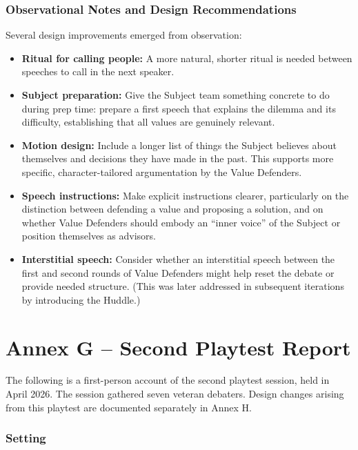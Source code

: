 \documentclass[12pt]{article}
\begin{document}
\subsubsection{Observational Notes and Design Recommendations}

Several design improvements emerged from observation:

\begin{itemize}
    \item \textbf{Ritual for calling people:} A more natural, shorter ritual is needed between speeches to call in the next speaker.
    \item \textbf{Subject preparation:} Give the Subject team something concrete to do during prep time: prepare a first speech that explains the dilemma and its difficulty, establishing that all values are genuinely relevant.
    \item \textbf{Motion design:} Include a longer list of things the Subject believes about themselves and decisions they have made in the past. This supports more specific, character-tailored argumentation by the Value Defenders.
    \item \textbf{Speech instructions:} Make explicit instructions clearer, particularly on the distinction between defending a value and proposing a solution, and on whether Value Defenders should embody an ``inner voice'' of the Subject or position themselves as advisors.
    \item \textbf{Interstitial speech:} Consider whether an interstitial speech between the first and second rounds of Value Defenders might help reset the debate or provide needed structure. (This was later addressed in subsequent iterations by introducing the Huddle.)
\end{itemize}


\newpage
\section*{Annex G -- Second Playtest Report}

The following is a first-person account of the second playtest session, held in April 2026. The session gathered seven veteran debaters. Design changes arising from this playtest are documented separately in Annex H.

\subsubsection{Setting}
\end{document}
